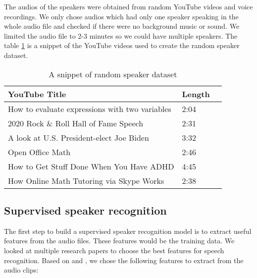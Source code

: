 \documentclass[10pt,twocolumn,letterpaper]{article}
\begin{document}
{The audios of the speakers were obtained from random YouTube videos and voice recordings. We only chose audios which had only one speaker speaking in the whole audio file and checked if there were no background music or sound. We limited the audio file to 2-3 minutes so we could have multiple speakers. The table \ref{tab:random-speaker-dataset} is a snippet of the YouTube videos used to create the random speaker dataset.



\begin{table}[h]
        \begin{tabular}{|l|l|l|}
        \hline
        \textbf{YouTube Title}                                       & \textbf{Length} \\ \hline
        How to evaluate expressions with two variables               & 2:04                         \\ \hline
        2020 Rock \& Roll Hall of Fame Speech                        & 2:31                         \\ \hline
        A look at U.S. President-elect Joe Biden                     & 3:32                         \\ \hline
        Open Office Math                                             & 2:46                         \\ \hline
        How to Get Stuff Done When You Have ADHD                     & 4:45                         \\ \hline
        How Online Math Tutoring via Skype Works                     & 2:38                         \\ \hline
        \end{tabular}
        \caption{A snippet of random speaker dataset}
        \label{tab:random-speaker-dataset}
\end{table}
 
}
\subsection{Supervised speaker recognition}


The first step to build a supervised speaker recognition model is to extract useful features from the audio files. These features would be the training data. We looked at multiple research papers to choose the best features for speech recognition. Based on \cite{Sharma} and \cite{Sonam}, we chose the following features to extract from the audio clips:
\end{document}

